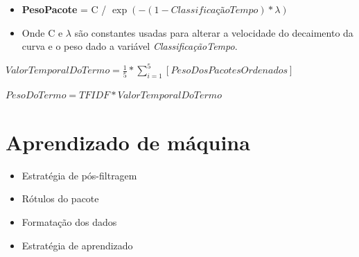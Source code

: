 \begin{frame}
\begin{itemize}
    \item \textbf{PesoPacote} = C / $\exp\left(-({1 - ClassificaçãoTempo}) * {\lambda}\right)$
    \item Onde C e ${\lambda}$ são constantes usadas para alterar a velocidade do
decaimento da curva e o peso dado a variável \textit{ClassificaçãoTempo}.
\end{itemize}
\end{frame}

\begin{frame}
    $ValorTemporalDoTermo = \frac{1}{5} * \sum\limits_{i=1}^{5} [Peso Dos Pacotes Ordenados]$
\end{frame}

\begin{frame}
    $PesoDoTermo = TFIDF * ValorTemporalDoTermo$
\end{frame}


\section{Aprendizado de máquina} %

\begin{frame}

    \begin{itemize}
        \item Estratégia de pós-filtragem
        \item Rótulos do pacote
        \item Formatação dos dados
        \item Estratégia de aprendizado
    \end{itemize}

\end{frame}

